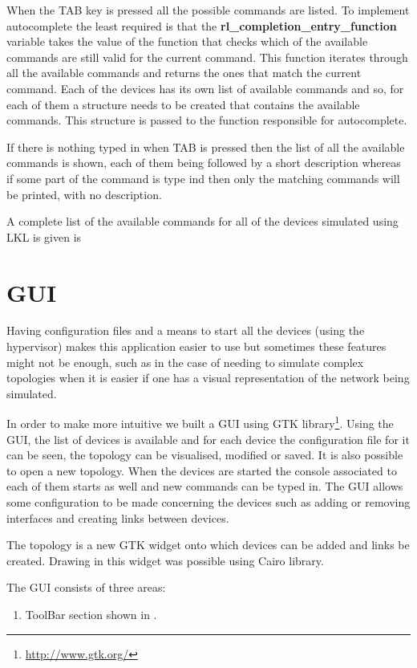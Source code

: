 {{When the TAB key is pressed all the possible commands are listed. To implement autocomplete the least required is that the \textbf{rl_completion_entry_function} variable takes the value of the function that checks which of the available commands are still valid for the current command. This function iterates through all the available commands and returns the ones that match the current command. Each of the devices has its own list of available commands and so, for each of them a structure needs to be created that contains the available commands. This structure is passed to the function responsible for autocomplete. 

If there is nothing typed in when TAB is pressed then the list of all the available commands is shown, each of them being followed by a short description whereas if some part of the command is type ind then only the matching commands will be printed, with no description.

A complete list of the available commands for all of the devices simulated using LKL is given is 

\section{GUI}
\label{sec:gui}
Having configuration files and a means to start all the devices (using the hypervisor) makes this application easier to use but sometimes these features might not be enough, such as in the case of needing to simulate complex topologies when it is easier if one has a visual representation of the network being simulated.

In order to make \project more intuitive we built a GUI using GTK library\footnote{\url{http://www.gtk.org/}}. Using the GUI, the list of devices is available and for each device the configuration file for it can be seen, the topology can be visualised, modified or saved. It is also possible to open a new topology. When the devices are started the console associated to each of them starts as well and new commands can be typed in. The GUI allows some configuration to be made concerning the devices such as adding or removing interfaces and creating links between devices.

The topology is a new GTK widget onto which devices can be added and links be created. Drawing in this widget was possible using Cairo library.

The GUI consists of three areas:
\begin{enumerate}
\item ToolBar section shown in .


\end{enumerate}}}
